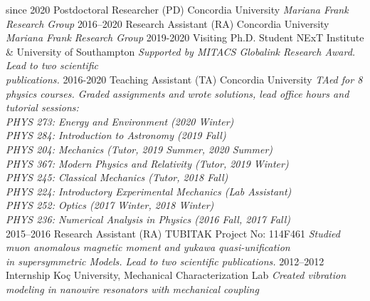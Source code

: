 \documentclass[]{friggeri-cv}
\begin{document}
\begin{entrylist}
    \entry
	{since 2020}
	{Postdoctoral Researcher (PD)}
	{Concordia University}
    {\emph{Mariana Frank Research Group}}		
    \entry
	{2016--2020}
	{Research Assistant (RA)}
	{Concordia University}
	{\emph{Mariana Frank Research Group}}	
	 \entry
    {2019-2020}
    {Visiting Ph.D. Student}
    {NExT Institute \& University of Southampton}
    {\emph {Supported by MITACS Globalink Research Award. Lead to two scientific \\ publications.}}
    \entry
    {2016-2020}
    {Teaching Assistant (TA)}
    {Concordia University}
    {\emph{
    TAed for 8 physics courses. Graded assignments and wrote solutions, lead office hours and tutorial sessions: \\
    PHYS 273: Energy and Environment (2020 Winter) \\		
    PHYS 284: Introduction to Astronomy (2019 Fall) \\
    PHYS 204: Mechanics (Tutor, 2019 Summer, 2020 Summer) \\    		
    PHYS 367: Modern Physics and Relativity (Tutor, 2019 Winter) \\		
    PHYS 245: Classical Mechanics (Tutor, 2018 Fall) \\
	PHYS 224: Introductory Experimental Mechanics (Lab Assistant) \\    		
    PHYS 252: Optics (2017 Winter, 2018 Winter) \\ 
	PHYS 236: Numerical Analysis in Physics (2016 Fall, 2017 Fall) \\
	}}
    \entry
    {2015--2016}
    {Research Assistant (RA)}
    {TUBITAK Project No: 114F461}
    {\emph{Studied muon anomalous magnetic moment and yukawa quasi-unification \\ in supersymmetric Models. Lead to two scientific publications.}}  
    \entry
  	{2012--2012}
  	{Internship}
  	{Koç University, Mechanical Characterization Lab}
  	{\emph{Created vibration modeling in nanowire resonators with mechanical coupling }}  
\end{entrylist}

\newpage
\end{document}
